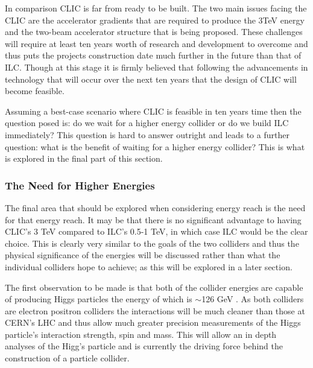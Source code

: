 In comparison CLIC is far from ready to be built. The two main issues facing the CLIC are the accelerator gradients that are required to produce the 3TeV energy and the two-beam accelerator structure that is being proposed. These challenges will require at least ten years worth of research and development to overcome and thus puts the projects construction date much further in the future than that of ILC. Though at this stage it is firmly believed that following the advancements in technology that will occur over the next ten years that the design of CLIC will become feasible.

Assuming a best-case scenario where CLIC is feasible in ten years time then the question posed is: do we wait for a higher energy collider or do we build ILC immediately? This question is hard to answer outright and leads to a further question: what is the benefit of waiting for a higher energy collider? This is what is explored in the final part of this section. %

\subsubsection{The Need for Higher Energies}
\label{higherEnergies}
The final area that should be explored when considering energy reach is the need for that energy reach. It may be that there is no significant advantage to having CLIC's 3 TeV compared to ILC's 0.5-1 TeV, in which case ILC would be the clear choice. This is clearly very similar to the goals of the two colliders and thus the physical significance of the energies will be discussed rather than what the individual colliders hope to achieve; as this will be explored in a later section. %

The first observation to be made is that both of the collider energies are capable of producing Higgs particles the energy of which is $\sim$126 GeV \cite{CERN:Higgs}. As both colliders are electron positron colliders the interactions will be much cleaner than those at CERN's LHC and thus allow much greater precision measurements of the Higgs particle's interaction strength, spin and mass. This will allow an in depth analyses of the Higg's particle and is currently the driving force behind the construction of a particle collider.

